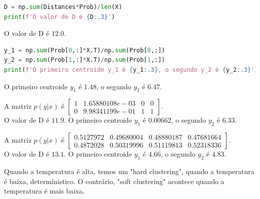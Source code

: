 \documentclass{homeworkclass}
\begin{document}
\begin{homeworkProblem}
\begin{homeworkSection}
\begin{lstlisting}[language=Python]
D = np.sum(Distances*Prob)/len(X)
print(f'O valor de D é {D:.3}')
\end{lstlisting}
O valor de D é $12.0$.

\end{homeworkSection}

\begin{homeworkSection}
\begin{lstlisting}[language=Python]
y_1 = np.sum(Prob[0,:]*X.T)/np.sum(Prob[0,:])
y_2 = np.sum(Prob[1,:]*X.T)/np.sum(Prob[1,:])
print(f'O primeiro centroide y_1 é {y_1:.3}, o segundo y_2 é {y_2:.3}')

\end{lstlisting}
O primeiro centroide $y_1$ é $ 1.48 $, o segundo $y_2$ é $ 6.47 $.

\end{homeworkSection}



\begin{homeworkSection}
A matriz $p(y|x)$ é $\begin{bmatrix}
1 & 1.65880108e-03 & 0 & 0 \\ 
0 & 9.98341199e-01 & 1 & 1
\end{bmatrix} $. \\
O valor de D é $11.9$.
O primeiro centroide $y_1$ é $ 0.00662 $, o segundo $y_2$ é $ 6.33 $.	
\end{homeworkSection}



\begin{homeworkSection}
	A matriz $p(y|x)$ é $\begin{bmatrix}
	0.5127972 & 0.49680004 & 0.48880187 & 0.47681664 \\ 
	0.4872028 & 0.50319996 & 0.51119813 & 0.52318336
	\end{bmatrix} $. \\
	O valor de D é $13.1$.
	O primeiro centroide $y_1$ é $ 4.66 $, o segundo $y_2$ é $ 4.83 $.	
\end{homeworkSection}

\begin{homeworkSection}
	Quando a temperatura é alta, temos um "hard clustering", quando a temperatura é baixa, determínistico. O contrário, "soft clustering" acontece quando a temperatura é mais baixa.
\end{homeworkSection}

\end{homeworkProblem}
\end{document}

